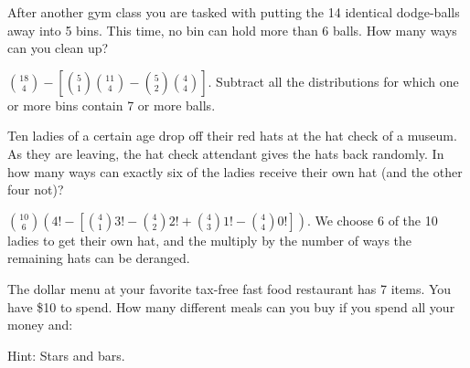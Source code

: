 \begin{questions}

	
\question After another gym class you are tasked with putting the 14 identical dodge-balls away into 5 bins.  This time, no bin can hold more than 6 balls. How many ways can you clean up?


	\begin{answer}

 ${18 \choose 4} - \left[ {5 \choose 1}{11 \choose 4} - {5 \choose 2}{4 \choose 4}\right]$.  Subtract all the distributions for which one or more bins contain 7 or more balls.  %

	\end{answer}	


\question Ten ladies of a certain age drop off their red hats at the hat check of a museum.  As they are leaving, the hat check attendant gives the hats back randomly.  In how many ways can exactly six of the ladies receive their own hat (and the other four not)?

	\begin{answer}
	${10 \choose 6}\left(4! - \left[{4 \choose 1} 3! - {4 \choose 2}2! + {4 \choose 3}1! - {4 \choose 4}0!\right]\right)$.  We choose 6 of the 10 ladies to get their own hat, and the multiply by the number of ways the remaining hats can be deranged. 
	\end{answer}
	
	
\question The dollar menu at your favorite tax-free fast food restaurant has 7 items.  You have \$10 to spend. How many different meals can you buy if you spend all your money and: 

  \begin{answer}
  Hint: Stars and bars.
\end{answer}
\end{questions}
